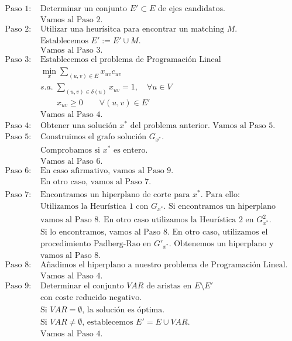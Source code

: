 \documentclass[twoside,a4paper,openright,12pt]{book}
\begin{document}
\begin{align*}
\text{Paso 1: }&\text{Determinar un conjunto $E'\subset E$ de ejes candidatos.}\\
&\text{Vamos al Paso 2.}\\
\text{Paso 2: }&\text{Utilizar una heurísitca para encontrar un matching $M$.}\\
&\text{Establecemos $E':=E'\cup M$.}\\
&\text{Vamos al Paso 3.}\\
\text{Paso 3: }& \text{Establecemos el problema de Programación Lineal}\\
& \min_x  \sum_{(u,v) \in E}x_{uv}c_{uv}\\
&s.a.\;\sum_{(u,v)\in\delta(u)} x_{uv} = 1, \quad \forall u \in V\\
&\qquad x_{uv} \geq 0 \qquad \forall(u,v)\in E'\\
&\text{Vamos al Paso 4.}\\
\text{Paso 4: }&\text{Obtener una solución $x^*$ del problema anterior. Vamos al Paso 5.}\\
\text{Paso 5: }&\text{Construimos el grafo solución $G_{x^*}$.}\\
&\text{Comprobamos si $x^*$ es entero.}\\
&\text{Vamos al Paso 6.}\\
\text{Paso 6: }& \text{En caso afirmativo, vamos al Paso 9.}\\
&\text{En otro caso, vamos al Paso 7.}\\
\text{Paso 7: }&\text{Encontramos un hiperplano de corte para $x^*$. Para ello:}\\
&\text{Utilizamos la Heurística 1 con $G_{x^*}$. Si encontramos un hiperplano}\\
&\text{vamos al Paso 8. En otro caso utilizamos la Heurística 2 en $G^2_{x^*}$.}\\
&\text{Si lo encontramos, vamos al Paso 8. En otro caso, utilizamos el}\\
&\text{procedimiento Padberg-Rao en $G'_{x^*}$. Obtenemos un hiperplano y}\\
&\text{vamos al Paso 8.}\\
\text{Paso 8: }&\text{Añadimos el hiperplano a nuestro problema de Programación Lineal.}\\
&\text{Vamos al Paso 4.}\\
\text{Paso 9: }&\text{Determinar el conjunto $VAR$ de aristas en $E\setminus E'$}\\
&\text{con coste reducido negativo.}\\
&\text{Si $VAR=\emptyset$, la solución es óptima. }\\
&\text{Si $VAR\neq\emptyset$, establecemos $E'=E\cup VAR$.}\\
&\text{Vamos al Paso 4.}
\end{align*}
\end{document}
